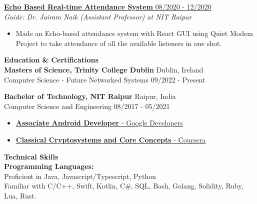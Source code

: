 \documentclass{article}
\begin{document}
\noindent \normalsize \href{https://dx.doi.org/10.1504/ijiids.2022.10044370}{\textbf{Echo Based Real-time Attendance System} \hfill 08/2020 - 12/2020} \\
\textit{Guide: Dr. Jairam Naik (Assistant Professor) at NIT Raipur}
\begin{itemize}
    \item  Made an Echo-based attendance system with React GUI using Quiet Modem Project to take attendance of all the available listeners in one shot.
\end{itemize}
\noindent \large \textbf{\textcolor{NavyBlue}{Education \& Certifications}} \vspace{3pt} \\
\normalsize \textbf{Masters of Science, Trinity College Dublin} \hfill Dublin, Ireland\\
Computer Science - Future Networked Systems \hfill 09/2022 - Present
\vspace{3pt}

\noindent \normalsize \textbf{Bachelor of Technology, NIT Raipur} \hfill Raipur, India \\
Computer Science and Engineering \hfill 08/2017 - 05/2021
\vspace{3pt}

\begin{itemize}[noitemsep,nolistsep,leftmargin=*]
    \item { \normalsize \href{https://www.credential.net/623b189c-719c-4845-b489-1b1618d4da79}{\textbf{Associate Android Developer} - Google Developers } }
    \item { \normalsize \href{https://www.coursera.org/account/accomplishments/certificate/X4CNCJXC335V}{\textbf{Classical Cryptosystems and Core Concepts} - Coursera} }
\end{itemize}
\vspace{3pt}

\noindent \large \textbf{\textcolor{NavyBlue}{Technical Skills}} \vspace{3pt} \\
\noindent \normalsize \textbf{Programming Languages:} \\
\noindent \normalsize Proficient in Java, Javascript/Typescript, Python \\
\noindent \normalsize Familiar with C/C++, Swift, Kotlin, C\#, SQL, Bash, Golang, Solidity, Ruby, Lua, Rust.
\vspace{3pt}
\end{document}
